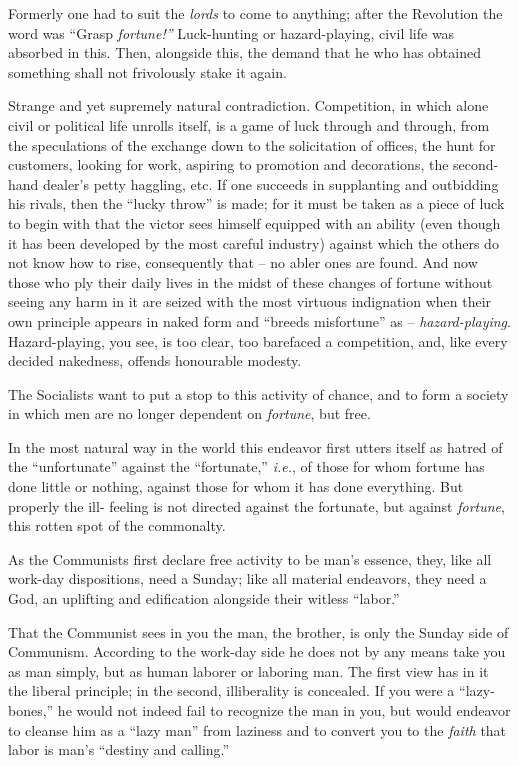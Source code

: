 Formerly one had to suit the \textit{lords} to come to anything; after the 
Revolution the word was ``Grasp \textit{fortune!''} Luck-hunting or 
hazard-playing, civil life was absorbed in this. Then, alongside this, the 
demand that he who has obtained something shall not frivolously stake it 
again.

Strange and yet supremely natural contradiction. Competition, in which alone 
civil or political life unrolls itself, is a game of luck through and through, 
from the speculations of the exchange down to the solicitation of offices, the 
hunt for customers, looking for work, aspiring to promotion and decorations, 
the second-hand dealer's petty haggling, etc. If one succeeds in supplanting 
and outbidding his rivals, then the ``lucky throw'' is made; for it must be 
taken as a piece of luck to begin with that the victor sees himself equipped 
with an ability (even though it has been developed by the most careful 
industry) against which the others do not know how to rise, consequently that 
-- no abler ones are found. And now those who ply their daily lives in the 
midst of these changes of fortune without seeing any harm in it are seized 
with the most virtuous indignation when their own principle appears in naked 
form and ``breeds misfortune'' as -- \textit{hazard-playing}. 
Hazard-playing, you see, is too clear, too barefaced a competition, and, like 
every decided nakedness, offends honourable modesty.

The Socialists want to put a stop to this activity of chance, and to form a 
society in which men are no longer dependent on \textit{fortune}, but free.

In the most natural way in the world this endeavor first utters itself as 
hatred of the ``unfortunate'' against the ``fortunate,'' \textit{i.e.}, of 
those for whom fortune has done little or nothing, against those for whom it 
has done everything. But properly the ill- feeling is not directed against the 
fortunate, but against \textit{fortune}, this rotten spot of the commonalty.

As the Communists first declare free activity to be man's essence, they, like 
all work-day dispositions, need a Sunday; like all material endeavors, they 
need a God, an uplifting and edification alongside their witless ``labor.''

That the Communist sees in you the man, the brother, is only the Sunday side 
of Communism. According to the work-day side he does not by any means take you 
as man simply, but as human laborer or laboring man. The first view has in it 
the liberal principle; in the second, illiberality is concealed. If you were a 
``lazy-bones,'' he would not indeed fail to recognize the man in you, but 
would endeavor to cleanse him as a ``lazy man'' from laziness and to convert 
you to the \textit{faith} that labor is man's ``destiny and calling.''

